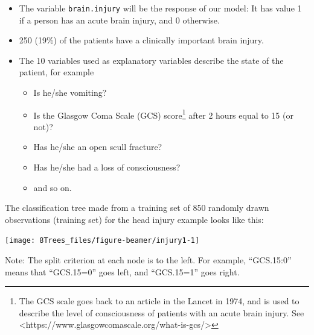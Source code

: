 \documentclass[10pt,ignorenonframetext,]{beamer}
\providecommand{\tightlist}{%
  \setlength{\itemsep}{0pt}\setlength{\parskip}{0pt}}
\begin{document}
\begin{frame}[fragile]

\begin{itemize}
\tightlist
\item
  The variable \texttt{brain.injury} will be the response of our model:
  It has value 1 if a person has an acute brain injury, and 0 otherwise.
\end{itemize}

\vspace{0mm}

\begin{itemize}
\tightlist
\item
  250 (19\%) of the patients have a clinically important brain injury.
\end{itemize}

\vspace{0mm}

\begin{itemize}
\item
  The 10 variables used as explanatory variables describe the state of
  the patient, for example

  \begin{itemize}
  \tightlist
  \item
    Is he/she vomiting?
  \item
    Is the Glasgow Coma Scale (GCS)
    score\footnote{The GCS scale goes back to an article in the Lancet in 1974, and is used to describe the level of consciousness of patients with an acute brain injury. See <https://www.glasgowcomascale.org/what-is-gcs/>}
    after 2 hours equal to 15 (or not)?
  \item
    Has he/she an open scull fracture?
  \item
    Has he/she had a loss of consciousness?
  \item
    and so on.
  \end{itemize}
\end{itemize}

\end{frame}

\begin{frame}

The classification tree made from a training set of 850 randomly drawn
observations (training set) for the head injury example looks like this:

\begin{center}\texttt{[image: 8Trees\_files/figure-beamer/injury1-1]} \end{center}

\small
Note: The split criterion at each node is to the left. For example,
``GCS.15:0'' means that ``GCS.15=0'' goes left, and ``GCS.15=1'' goes
right.

\end{frame}
\end{document}
